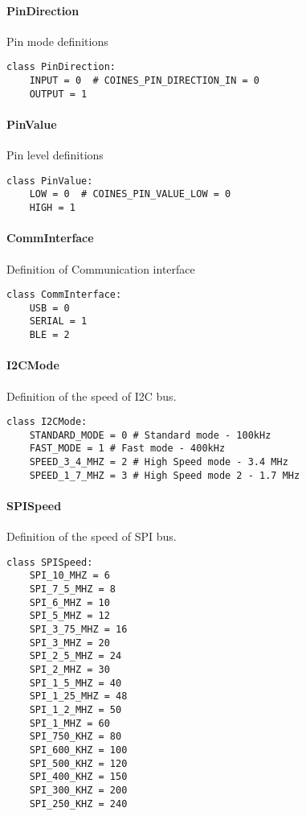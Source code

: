\paragraph{PinDirection}\label{PinDirection}

Pin mode definitions

\begin{lstlisting}
class PinDirection:
    INPUT = 0  # COINES_PIN_DIRECTION_IN = 0
    OUTPUT = 1
\end{lstlisting}

\paragraph{PinValue}\label{PinValue}

Pin level definitions

\begin{lstlisting}
class PinValue:
    LOW = 0  # COINES_PIN_VALUE_LOW = 0
    HIGH = 1
\end{lstlisting}

\paragraph{CommInterface}\label{CommInterface}

Definition of Communication interface

\begin{lstlisting}
class CommInterface:
    USB = 0
    SERIAL = 1
    BLE = 2
\end{lstlisting}

\paragraph{I2CMode}\label{I2CMode}

Definition of the speed of I2C bus.

\begin{lstlisting}
class I2CMode:
	STANDARD_MODE = 0 # Standard mode - 100kHz
	FAST_MODE = 1 # Fast mode - 400kHz
	SPEED_3_4_MHZ = 2 # High Speed mode - 3.4 MHz
	SPEED_1_7_MHZ = 3 # High Speed mode 2 - 1.7 MHz
\end{lstlisting}

\paragraph{SPISpeed}\label{SPISpeed}

Definition of the speed of SPI bus.

\begin{lstlisting}
class SPISpeed:
	SPI_10_MHZ = 6
	SPI_7_5_MHZ = 8
	SPI_6_MHZ = 10
	SPI_5_MHZ = 12
	SPI_3_75_MHZ = 16
	SPI_3_MHZ = 20
	SPI_2_5_MHZ = 24
	SPI_2_MHZ = 30
	SPI_1_5_MHZ = 40
	SPI_1_25_MHZ = 48
	SPI_1_2_MHZ = 50
	SPI_1_MHZ = 60
	SPI_750_KHZ = 80
	SPI_600_KHZ = 100
	SPI_500_KHZ = 120
	SPI_400_KHZ = 150
	SPI_300_KHZ = 200
	SPI_250_KHZ = 240
\end{lstlisting}

